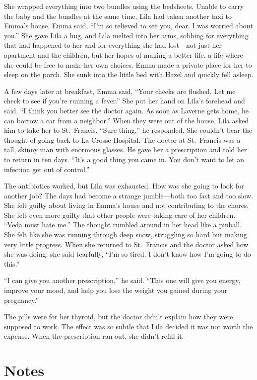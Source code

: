 \documentclass[
  letterpaper,
]{book}
\begin{document}
She wrapped everything into two bundles using the bedsheets. Unable to
carry the baby and the bundles at the same time, Lila had taken another
taxi to Emma's house. Emma said, ``I'm so relieved to see you, dear. I
was worried about you.'' She gave Lila a hug, and Lila melted into her
arms, sobbing for everything that had happened to her and for everything
she had lost---not just her apartment and the children, but her hopes of
making a better life, a life where she could be free to make her own
choices. Emma made a private place for her to sleep on the porch. She
sunk into the little bed with Hazel and quickly fell asleep.

A few days later at breakfast, Emma said, ``Your cheeks are flushed. Let
me check to see if you're running a fever.'' She put her hand on Lila's
forehead and said, ``I think you better see the doctor again. As soon as
Laverne gets home, he can borrow a car from a neighbor.'' When they were
out of the house, Lila asked him to take her to St.~Francis. ``Sure
thing,'' he responded. She couldn't bear the thought of going back to La
Crosse Hospital. The doctor at St.~Francis was a tall, skinny man with
enormous glasses. He gave her a prescription and told her to return in
ten days. ``It's a good thing you came in. You don't want to let an
infection get out of control.''

The antibiotics worked, but Lila was exhausted. How was she going to
look for another job? The days had become a strange jumble---both too
fast and too slow. She felt guilty about living in Emma's house and not
contributing to the chores. She felt even more guilty that other people
were taking care of her children. ``Veda must hate me.'' The thought
rumbled around in her head like a pinball. She felt like she was running
through deep snow, struggling so hard but making very little progress.
When she returned to St.~Francis and the doctor asked how she was doing,
she said tearfully, ``I'm so tired. I don't know how I'm going to do
this.''

``I can give you another prescription,'' he said. ``This one will give
you energy, improve your mood, and help you lose the weight you gained
during your pregnancy.''

The pills were for her thyroid, but the doctor didn't explain how they
were supposed to work. The effect was so subtle that Lila decided it was
not worth the expense. When the prescription ran out, she didn't refill
it.

\section{Notes}\label{notes-49}
\end{document}
